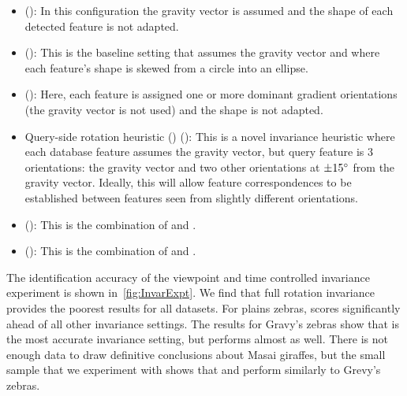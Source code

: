         \begin{itemize}

            \item \NoInvar{} (): %
            In this configuration the gravity vector is assumed and the
              shape of each detected feature is not adapted.

            \item \AIAlone{} (): %
            This is the baseline setting that assumes the gravity
              vector and where each feature's shape is skewed from a
              circle into an ellipse.

            \item \RIAlone{} (): %
            Here, each feature is assigned one or more dominant
              gradient orientations (the gravity vector is not used) and
              the shape is not adapted.

            \item Query-side rotation heuristic (\QRHCirc{})
              (): %
            This is a novel invariance heuristic where each {database}
              feature assumes the gravity vector, but {query} feature is
              $3$ orientations:
            the gravity vector and two other orientations at
              $\pm15^{\circ}$ from the gravity vector.
            Ideally, this will allow feature correspondences to be
              established between features seen from slightly different
              orientations.

            \item \QRHEll{} (): %
                This is the combination of \QRHCirc{} and \AIAlone{}.

            \item \AIRI{} (): %
                This is the combination of \RIAlone{} and \AIAlone{}.

        \end{itemize}

        The identification accuracy of the viewpoint and time
          controlled invariance experiment is shown
          in~\cref{fig:InvarExpt}.
        We find that full rotation invariance provides the poorest
          results for all datasets.
        For plains zebras, \QRHCirc{} scores significantly ahead of all
          other invariance settings.
        The results for Gravy's zebras show that \AIAlone{} is the most
          accurate invariance setting, but \QRHEll{} performs almost as
          well.
        There is not enough data to draw definitive conclusions about
          Masai giraffes, but the small sample that we experiment with
          shows that \AIAlone{} and \QRHEll{} perform similarly to
          Grevy's zebras.

